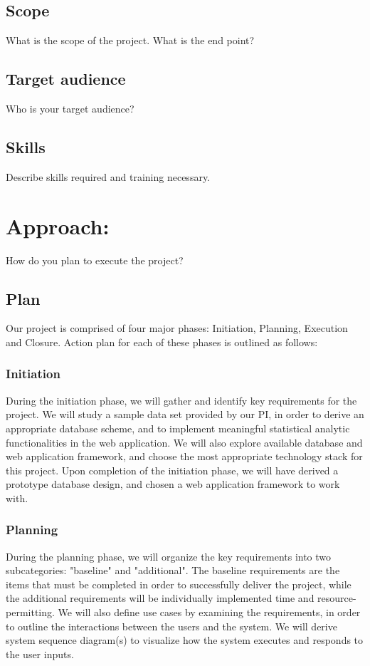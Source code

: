 \documentclass[10pt,twocolumn,letterpaper]{article}
\begin{document}
            \subsection{Scope}

            What is the scope of the project. What is the end point?

            \subsection{Target audience}

            Who is your target audience?

            \subsection{Skills}

            Describe skills required and training necessary.

	   	\section{Approach:}

        How do you plan to execute the project? 

            \subsection{Plan}
            Our project is comprised of four major phases: Initiation, Planning, Execution and Closure. Action plan for each of these phases is outlined as follows:
                \subsubsection{Initiation}
                During the initiation phase, we will gather and identify key requirements for the project. We will study a sample data set provided by our PI, in order to derive an appropriate database scheme, and to implement meaningful statistical analytic functionalities in the web application. We will also explore available database and web application framework, and choose the most appropriate technology stack for this project. Upon completion of the initiation phase, we will have derived a prototype database design, and chosen a web application framework to work with.
                \subsubsection{Planning}
                During the planning phase, we will organize the key requirements into two subcategories: "baseline" and "additional". The baseline requirements are the items that must be completed in order to successfully deliver the project, while the additional requirements will be individually implemented time and resource-permitting. We will also define use cases by examining the requirements, in order to outline the interactions between the users and the system. We will derive system sequence diagram(s) to visualize how the system executes and responds to the user inputs.
\end{document}
